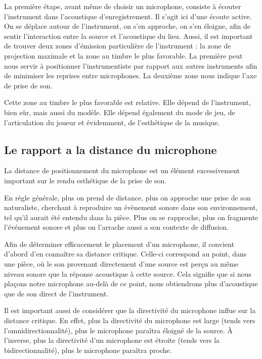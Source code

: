 \documentclass[
  letterpaper,
  DIV=11,
  numbers=noendperiod]{scrreprt}
\begin{document}
La première étape, avant même de choisir un microphone, consiste à
écouter l'instrument dans l'acoustique d'enregistrement. Il s'agit ici
d'une écoute active. On se déplace autour de l'instrument, on s'en
approche, on s'en éloigne, afin de sentir l'interaction entre la source
et l'acoustique du lieu. Aussi, il est important de trouver deux zones
d'émission particulière de l'instrument : la zone de projection maximale
et la zone au timbre le plus favorable. La première peut nous servir à
positionner l'instrumentiste par rapport aux autres instruments afin de
minimiser les reprises entre microphones. La deuxième zone nous indique
l'axe de prise de son.

Cette zone au timbre le plus favorable est relative. Elle dépend de
l'instrument, bien sûr, mais aussi du modèle. Elle dépend également du
mode de jeu, de l'articulation du joueur et évidemment, de l'esthétique
de la musique.

\hypertarget{le-rapport-a-la-distance-du-microphone}{%
\subsection{Le rapport a la distance du
microphone}\label{le-rapport-a-la-distance-du-microphone}}

La distance de positionnement du microphone est un élément excessivement
important sur le rendu esthétique de la prise de son.

En règle générale, plus on prend de distance, plus on approche une prise
de son naturaliste, cherchant à reproduire un évènement sonore dans son
environnement, tel qu'il aurait été entendu dans la pièce. Plus on se
rapproche, plus on fragmente l'événement sonore et plus on l'arrache
aussi a son contexte de diffusion.

Afin de déterminer efficacement le placement d'un microphone, il
convient d'abord d'en connaître sa distance critique. Celle-ci
correspond au point, dans une pièce, où le son provenant directement
d'une source est perçu au même niveau sonore que la réponse acoustique à
cette source. Cela signifie que si nous plaçons notre microphone au-delà
de ce point, nous obtiendrons plus d'acoustique que de son direct de
l'instrument.

Il est important aussi de considérer que la directivité du microphone
influe sur la distance critique. En effet, plus la directivité du
microphone est large (tends vers l'omnidirectionnalité), plus le
microphone paraîtra éloigné de la source. À l'inverse, plus la
directivité d'un microphone est étroite (tends vers la
bidirectionnalité), plus le microphone paraîtra proche.
\end{document}
